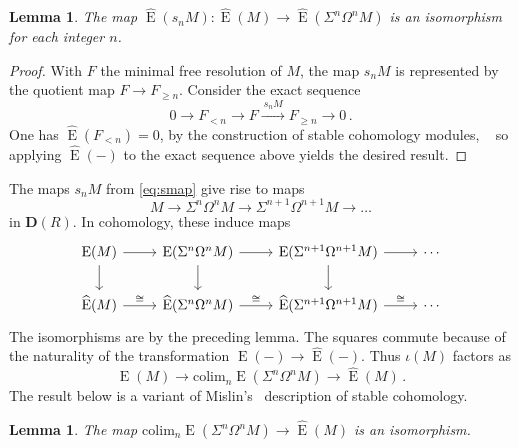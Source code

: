 \documentclass{amsart}
\numberwithin{equation}{section}
\theoremstyle{plain}
\newtheorem{lemma}[equation]{Lemma}
\theoremstyle{definition}
\theoremstyle{remark}
\newcommand{\dcat}{\mathbf{D}}
\newcommand{\eee}{\operatorname{E}}
\begin{document}
\begin{lemma}
\label{le:scfunctor}
The map $\widehat{\eee}(s_nM)\colon \widehat{\eee}(M)\to \widehat{\eee}(\Sigma^n\Omega^nM)$ is an isomorphism for each integer $n$. 
\end{lemma}

\begin{proof}
With $F$ the minimal free resolution of $M$, the map $s_nM$ is represented by the quotient map $F\to F_{\geqslant n}$. Consider the exact sequence
\[
0\longrightarrow F_{<n}\longrightarrow F\xrightarrow{\ s_nM\ } F_{\geqslant n}\longrightarrow 0\,.
\]
One has $\widehat{\eee}(F_{<n})=0$, by the construction of stable cohomology modules,   so applying $\widehat{\eee}(-)$ to the exact sequence above yields the desired result.
\end{proof}

The maps $s_nM$ from \eqref{eq:smap} give rise to maps
\[
M\longrightarrow \Sigma^n \Omega^n M \longrightarrow \Sigma^{n+1}\Omega^{n+1} M \longrightarrow\dots 
\]
in $\dcat(R)$. In cohomology, these induce maps
\[
\begin{tikzcd}
\eee(M) \arrow[d] \arrow[r] & \eee(\Sigma^n\Omega^n M) \arrow[d] \arrow[r] & \eee(\Sigma^{n+1}\Omega^{n+1} M) \arrow[d] \arrow[r] &\cdots  \\
\widehat{\eee}(M) \arrow[r, ,"\cong"] & \widehat{\eee}(\Sigma^n\Omega^n M) \arrow[r,"\cong"] & \widehat{\eee}(\Sigma^{n+1}\Omega^{n+1} M) \arrow[r,"\cong"] &\cdots  
\end{tikzcd}
\]
The isomorphisms are by the preceding lemma. The squares commute because of the naturality of the transformation $\eee(-)\to \widehat{\eee}(-)$. Thus $\iota(M)$ factors as
\[
\eee(M)\longrightarrow \mathrm{colim}_n \eee(\Sigma^n\Omega^n M) \longrightarrow \widehat{\eee}(M)\,.
\]
The result below is a variant of Mislin's~\cite{Mislin:1994a} description of stable cohomology.

\begin{lemma}
\label{le:Mislin}
    The map  $\mathrm{colim}_n \eee(\Sigma^n\Omega^n M) \to \widehat{\eee}(M)$ is an isomorphism.
\end{lemma}
\end{document}
